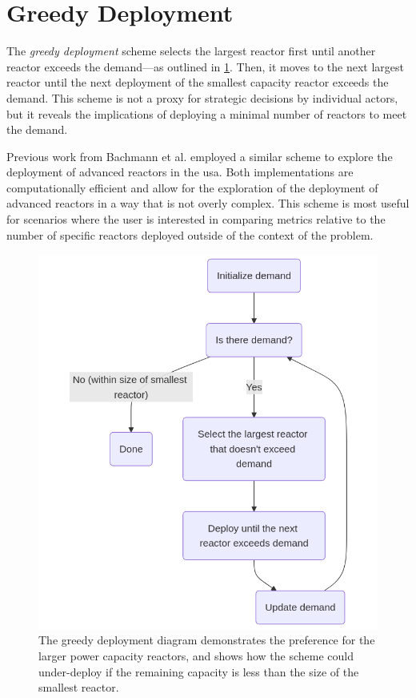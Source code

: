 \section{Greedy Deployment}
\label{sec:greedy_deployment}

The \textit{greedy deployment} scheme selects the largest reactor first until another
reactor exceeds the demand---as outlined in \ref{fig:greedy_diagram}. Then, it moves to the next largest reactor until the next deployment of the smallest capacity reactor exceeds the demand. This scheme is not a proxy for strategic decisions by individual actors, but it reveals the implications of deploying a minimal number of reactors to meet the demand.

Previous work from Bachmann et al. \cite{bachmann_enrichment_2021} employed a similar scheme to explore the deployment of advanced reactors in the \gls{usa}. Both implementations are computationally efficient and allow for the exploration of the deployment of advanced reactors in a way that is not overly complex. This scheme is most useful for scenarios where the user is interested in comparing metrics relative to the number of specific reactors deployed outside of the context of the problem.

\begin{figure}[H]
    \centering
    \includegraphics[scale=0.3]{images/schemes/greedy_diagram.png}
    \caption{The greedy deployment diagram demonstrates the preference for the larger power capacity reactors, and shows how the scheme could under-deploy if the remaining capacity is less than the size of the smallest reactor.}
    \label{fig:greedy_diagram}
\end{figure}

